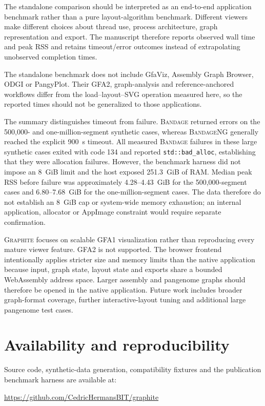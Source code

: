 \documentclass[11pt]{article}
\newcommand{\graphite}{\textsc{Graphite}\xspace}
\newcommand{\bandage}{\textsc{Bandage}\xspace}
\newcommand{\bandageng}{\textsc{BandageNG}\xspace}
\begin{document}
The standalone comparison should be interpreted as an end-to-end application benchmark rather than a pure layout-algorithm benchmark. Different viewers make different choices about thread use, process architecture, graph representation and export. The manuscript therefore reports observed wall time and peak RSS and retains timeout/error outcomes instead of extrapolating unobserved completion times.

The standalone benchmark does not include GfaViz, Assembly Graph Browser, ODGI or PangyPlot. Their GFA2, graph-analysis and reference-anchored workflows differ from the load--layout--SVG operation measured here, so the reported times should not be generalized to those applications.

The summary distinguishes timeout from failure. \bandage returned errors on the 500,000- and one-million-segment synthetic cases, whereas \bandageng generally reached the explicit 900~s timeout. All measured \bandage failures in these large synthetic cases exited with code 134 and reported \texttt{std::bad\_alloc}, establishing that they were allocation failures. However, the benchmark harness did not impose an 8~GiB limit and the host exposed 251.3~GiB of RAM. Median peak RSS before failure was approximately 4.28--4.43~GiB for the 500,000-segment cases and 6.80--7.68~GiB for the one-million-segment cases. The data therefore do not establish an 8~GiB cap or system-wide memory exhaustion; an internal application, allocator or AppImage constraint would require separate confirmation.

\graphite focuses on scalable GFA1 visualization rather than reproducing every mature viewer feature. GFA2 is not supported. The browser frontend intentionally applies stricter size and memory limits than the native application because input, graph state, layout state and exports share a bounded WebAssembly address space. Larger assembly and pangenome graphs should therefore be opened in the native application. Future work includes broader graph-format coverage, further interactive-layout tuning and additional large pangenome test cases.

\section{Availability and reproducibility}
Source code, synthetic-data generation, compatibility fixtures and the publication benchmark harness are available at:

\begin{center}
\url{https://github.com/CedricHermansBIT/graphite}
\end{center}
\end{document}
